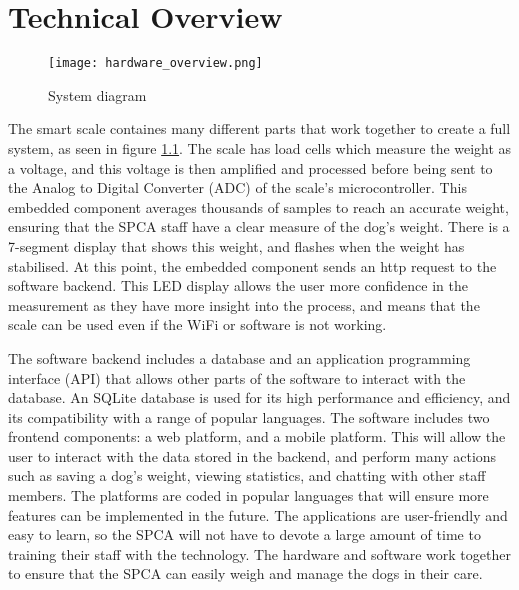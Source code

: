 
\chapter{Technical Overview}


\begin{figure}[!ht]
    \centering
    \texttt{[image: hardware\_overview.png]}
    \caption{System diagram}
    \label{fig:sys_diagram}
\end{figure}

The smart scale containes many different parts that work together to create a full system, as seen in figure \ref{fig:sys_diagram}. 
The scale has load cells which measure the weight as a voltage, and this voltage is then amplified and processed before being sent to the Analog to Digital Converter (ADC) of the scale's microcontroller. This embedded component averages thousands of samples to reach an accurate weight, ensuring that the SPCA staff have a clear measure of the dog's weight. There is a 7-segment display that shows this weight, and flashes when the weight has stabilised. At this point, the embedded component sends an http request to the software backend. This LED display allows the user more confidence in the measurement as they have more insight into the process, and means that the scale can be used even if the WiFi or software is not working. 

The software backend includes a database and an application programming interface (API) that allows other parts of the software to interact with the database. An SQLite database is used for its high performance and efficiency, and its compatibility with a range of popular languages. The software includes two frontend components: a web platform, and a mobile platform. This will allow the user to interact with the data stored in the backend, and perform many actions such as saving a dog's weight, viewing statistics, and chatting with other staff members. The platforms are coded in popular languages that will ensure more features can be implemented in the future. The applications are user-friendly and easy to learn, so the SPCA will not have to devote a large amount of time to training their staff with the technology. The hardware and software work together to ensure that the SPCA can easily weigh and manage the dogs in their care. 
